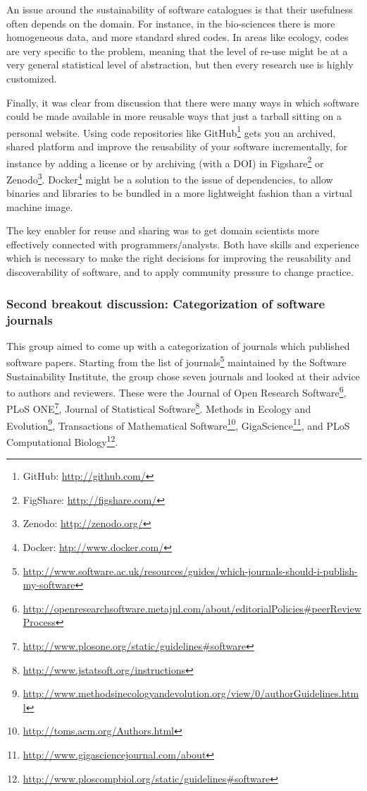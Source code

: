 \documentclass[11pt, oneside]{amsart}
\begin{document}
An issue around the sustainability of software catalogues is that their usefulness often depends on the domain. For instance, in the bio-sciences there is more homogeneous data, and more standard shred codes. In areas like ecology, codes are very specific to the problem, meaning that the level of re-use might be at a very general statistical level of abstraction, but then every research use is highly customized.

Finally, it was clear from discussion that there were many ways in which software could be made available in more reusable ways that just a tarball sitting on a personal website. Using code repositories like GitHub\footnote{GitHub: \url{http://github.com/}} gets you an archived, shared platform and improve the reusability of your software incrementally, for instance by adding a license or by archiving (with a DOI) in Figshare\footnote{FigShare: \url{http://figshare.com/}} or Zenodo\footnote{Zenodo: \url{http://zenodo.org/}}. Docker\footnote{Docker: \url{htp://www.docker.com/}} might be a solution to the issue of dependencies, to allow binaries and libraries to be bundled in a more lightweight fashion than a virtual machine image.

The key enabler for reuse and sharing was to get domain scientists more effectively connected with programmers/analysts. Both have skills and experience which is necessary to make the right decisions for improving the reusability and discoverability of software, and to apply community pressure to change practice.

\subsubsection{Second breakout discussion: Categorization of software journals}

This group aimed to come up with a categorization of journals which published software papers. Starting from the list of journals\footnote{\url{http://www.software.ac.uk/resources/guides/which-journals-should-i-publish-my-software}} maintained by the Software Sustainability Institute, the group chose seven journals and looked at their advice to authors and reviewers. These were the Journal of Open Research Software\footnote{\url{http://openresearchsoftware.metajnl.com/about/editorialPolicies\#peerReviewProcess}}, PLoS ONE\footnote{\url{http://www.plosone.org/static/guidelines\#software}}, Journal of Statistical Software\footnote{\url{http://www.jstatsoft.org/instructions}}. Methods in Ecology and Evolution\footnote{\url{http://www.methodsinecologyandevolution.org/view/0/authorGuidelines.html}}, Transactions of Mathematical Software\footnote{\url{http://toms.acm.org/Authors.html}}, GigaScience\footnote{\url{http://www.gigasciencejournal.com/about}}, and PLoS Computational Biology\footnote{\url{http://www.ploscompbiol.org/static/guidelines\#software}}.
\end{document}
